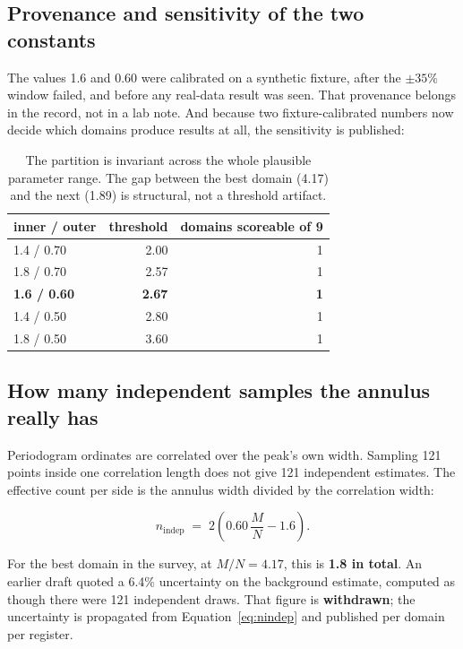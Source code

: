 \documentclass[11pt, letterpaper, openany]{book}
\begin{document}
\subsection{Provenance and sensitivity of the two constants}

The values 1.6 and 0.60 were calibrated on a synthetic fixture, after the $\pm 35\%$ window
failed, and before any real-data result was seen. That provenance belongs in the record, not in
a lab note. And because two fixture-calibrated numbers now decide which domains produce results
at all, the sensitivity is published:

\begin{table}[H]
\centering
\small
\begin{tabular}{@{}lrr@{}}
\toprule
\textbf{inner / outer} & \textbf{threshold} & \textbf{domains scoreable of 9} \\
\midrule
1.4 / 0.70 & 2.00 & 1 \\
1.8 / 0.70 & 2.57 & 1 \\
\textbf{1.6 / 0.60} & \textbf{2.67} & \textbf{1} \\
1.4 / 0.50 & 2.80 & 1 \\
1.8 / 0.50 & 3.60 & 1 \\
\bottomrule
\end{tabular}
\caption{The partition is invariant across the whole plausible parameter range. The gap between
the best domain (4.17) and the next (1.89) is structural, not a threshold artifact.}
\end{table}

\subsection{How many independent samples the annulus really has}

Periodogram ordinates are correlated over the peak's own width. Sampling 121 points inside one
correlation length does not give 121 independent estimates. The effective count per side is the
annulus width divided by the correlation width:

\begin{equation}
n_{\text{indep}} \;=\; 2\left( 0.60\,\frac{M}{N} - 1.6 \right).
\label{eq:nindep}
\end{equation}

For the best domain in the survey, at $M/N = 4.17$, this is \textbf{1.8 in total}. An earlier
draft quoted a 6.4\% uncertainty on the background estimate, computed as though there were 121
independent draws. That figure is \textbf{withdrawn}; the uncertainty is propagated from
Equation~\ref{eq:nindep} and published per domain per register.
\end{document}
